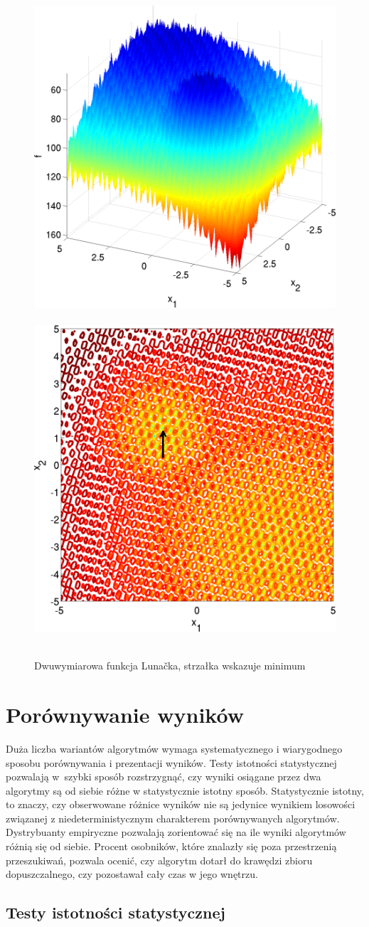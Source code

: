 \documentclass[a4paper,onecolumn,oneside,12pt,wide,floatssmall]{mwrep}
\theoremstyle{definition}
\theoremstyle{plain}%
\theoremstyle{remark}
\begin{document}
\begin{figure}[H]
\centering
\mbox{
\includegraphics[width=.45\textwidth]{img/24.png} \quad
\includegraphics[width=.45\textwidth]{img/24a.png} 
}
\caption{Dwuwymiarowa funkcja Lunačka, strzałka wskazuje minimum \cite{noiseless}}
\end{figure}

\section{Porównywanie wyników}

Duża liczba wariantów algorytmów wymaga systematycznego i wiarygodnego sposobu porównywania
i prezentacji wyników. Testy istotności statystycznej pozwalają w~szybki sposób rozstrzygnąć, czy 
wyniki osiągane przez dwa algorytmy są od siebie różne w statystycznie istotny sposób.
Statystycznie istotny, to znaczy, czy obserwowane różnice wyników nie są jedynice wynikiem losowości związanej
z niedeterministycznym charakterem porównywanych algorytmów.
Dystrybuanty empiryczne
pozwalają zorientować się na ile wyniki algorytmów różnią się od siebie. Procent osobników, które
znalazły się poza przestrzenią przeszukiwań, pozwala ocenić, czy algorytm dotarł do krawędzi
zbioru dopuszczalnego, czy pozostawał cały czas w jego wnętrzu.

\subsection{Testy istotności statystycznej}
\label{sec:testy_istotnosci}
\end{document}
